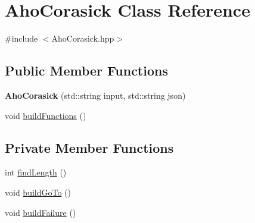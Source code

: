 \hypertarget{classAhoCorasick}{}\section{Aho\+Corasick Class Reference}
\label{classAhoCorasick}


{\ttfamily \#include $<$Aho\+Corasick.\+hpp$>$}

\subsection*{Public Member Functions}
\begin{DoxyCompactItemize}
\item 
\mbox{\label{classAhoCorasick_a7f5b25765ba7290b155bb09bc41948a4}} 
{\bfseries Aho\+Corasick} (std\+::string input, std\+::string json)
\item 
void \hyperlink{classAhoCorasick_a4562e5c069beb443c120856445e159c8}{build\+Functions} ()
\end{DoxyCompactItemize}
\subsection*{Private Member Functions}
\begin{DoxyCompactItemize}
\item 
int \hyperlink{classAhoCorasick_a7ef8e2eeeb8ce582283ee73198325f1b}{find\+Length} ()
\item 
void \hyperlink{classAhoCorasick_a54a087f0c1434bc9b753d8ab2d0dad1c}{build\+Go\+To} ()
\item 
void \hyperlink{classAhoCorasick_a8dae847b2d60d7844ae1677026f4eab5}{build\+Failure} ()
\end{DoxyCompactItemize}
